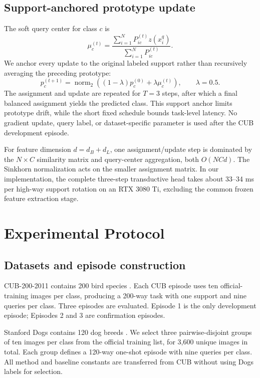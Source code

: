 \documentclass[]{spie}
\newcommand{\datasetcub}{CUB-200-2011\xspace}
\newcommand{\datasetdogs}{Stanford Dogs\xspace}
\begin{document}
\subsection{Support-anchored prototype update}

The soft query center for class $c$ is
\begin{equation}
 \mu_c^{(t)}=\frac{\sum_{i=1}^{N}P_{ic}^{(t)}z(x_i^q)}
 {\sum_{i=1}^{N}P_{ic}^{(t)}}.
 \label{eq:center}
\end{equation}
We anchor every update to the original labeled support rather than recursively
averaging the preceding prototype:
\begin{equation}
 p_c^{(t+1)}=\operatorname{norm}_2\left(
 (1-\lambda)p_c^{(0)}+\lambda\mu_c^{(t)}\right),
 \qquad \lambda=0.5.
 \label{eq:update}
\end{equation}
The assignment and update are repeated for $T=3$ steps, after which a final
balanced assignment yields the predicted class. This support anchor limits
prototype drift, while the short fixed schedule bounds task-level latency.
No gradient update, query label, or dataset-specific parameter is used after the
CUB development episode.

For feature dimension $d=d_B+d_L$, one assignment/update step is dominated by
the $N\times C$ similarity matrix and query-center aggregation, both
$O(NCd)$. The Sinkhorn normalization acts on the smaller assignment matrix. In
our implementation, the complete three-step transductive head takes about
33--34 ms per high-way support rotation on an RTX 3080 Ti, excluding the common
frozen feature extraction stage.

\section{Experimental Protocol}
\label{sec:protocol}

\subsection{Datasets and episode construction}

\datasetcub contains 200 bird species \cite{cubdataset}. Each CUB episode uses
ten official-training images per class, producing a 200-way task with one
support and nine queries per class. Three episodes are evaluated. Episode 1 is
the only development episode; Episodes 2 and 3 are confirmation episodes.

\datasetdogs contains 120 dog breeds \cite{stanforddogs}. We select three
pairwise-disjoint groups of ten images per class from the official training
list, for 3,600 unique images in total. Each group defines a 120-way one-shot
episode with nine queries per class. All method and baseline constants are
transferred from CUB without using Dogs labels for selection.
\end{document}
